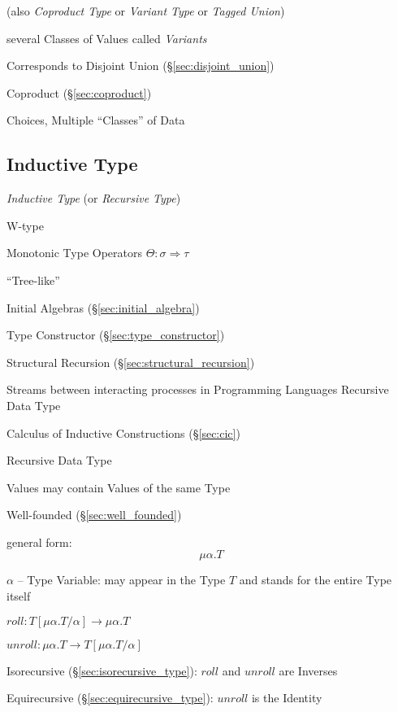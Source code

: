 (also \emph{Coproduct Type} or \emph{Variant Type} or \emph{Tagged
  Union})

several Classes of Values called \emph{Variants}

Corresponds to Disjoint Union (\S\ref{sec:disjoint_union})

Coproduct (\S\ref{sec:coproduct})

Choices, Multiple ``Classes'' of Data



\subsection{Inductive Type}\label{sec:inductive_type}

\emph{Inductive Type} (or \emph{Recursive Type})

W-type

Monotonic Type Operators $\Theta : \sigma \Rightarrow \tau$

``Tree-like''

Initial Algebras (\S\ref{sec:initial_algebra})

Type Constructor (\S\ref{sec:type_constructor})

Structural Recursion (\S\ref{sec:structural_recursion})

Streams between interacting processes in Programming Languages
Recursive Data Type

Calculus of Inductive Constructions (\S\ref{sec:cic})


\asterism


Recursive Data Type

Values may contain Values of the same Type

Well-founded (\S\ref{sec:well_founded})

general form:
\[
  \mu\alpha.T
\]

$\alpha$ -- Type Variable: may appear in the Type $T$ and stands for
the entire Type itself

$roll : T[\mu\alpha.T/\alpha] \rightarrow \mu\alpha.T$

$unroll : \mu\alpha.T \rightarrow T[\mu\alpha.T/\alpha]$

Isorecursive (\S\ref{sec:isorecursive_type}): $roll$ and $unroll$
are Inverses

Equirecursive (\S\ref{sec:equirecursive_type}): $unroll$ is the
Identity



